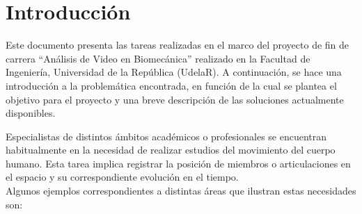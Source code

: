 \chapter{Introducción}

Este documento presenta las tareas realizadas en el marco del proyecto de fin de carrera ``Análisis de Video en Biomecánica'' realizado en la Facultad de Ingeniería, Universidad de la República (UdelaR). A continuación, se hace una introducción a la problemática encontrada, en función de la cual se plantea el objetivo para el proyecto y una breve descripción de las soluciones actualmente disponibles.
\vspace{5 mm}

Especialistas de distintos ámbitos académicos o profesionales se encuentran habitualmente en la necesidad de realizar estudios del movimiento del cuerpo humano. Esta tarea implica registrar la posición de miembros o articulaciones en el espacio y su correspondiente evolución en el tiempo.
\\ 

Algunos ejemplos correspondientes a distintas áreas que ilustran estas necesidades son:

